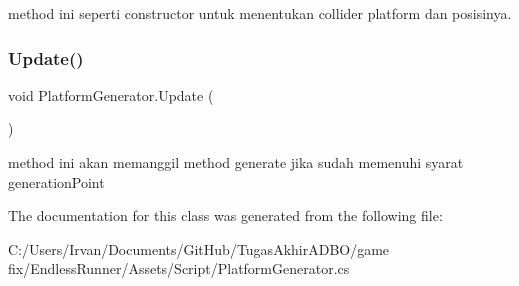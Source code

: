 method ini seperti constructor untuk menentukan collider platform dan posisinya. 

\hypertarget{class_platform_generator_a8e50d153f28945c3755b9d9bfb2fde9a}{}\label{class_platform_generator_a8e50d153f28945c3755b9d9bfb2fde9a} 
\subsubsection{\texorpdfstring{Update()}{Update()}}
{\footnotesize\ttfamily void Platform\+Generator.\+Update (\begin{DoxyParamCaption}{ }\end{DoxyParamCaption})\hspace{0.3cm}{\ttfamily [private]}}



method ini akan memanggil method generate jika sudah memenuhi syarat generation\+Point 



The documentation for this class was generated from the following file\+:\begin{DoxyCompactItemize}
\item 
C\+:/\+Users/\+Irvan/\+Documents/\+Git\+Hub/\+Tugas\+Akhir\+A\+D\+B\+O/game fix/\+Endless\+Runner/\+Assets/\+Script/Platform\+Generator.\+cs\end{DoxyCompactItemize}
